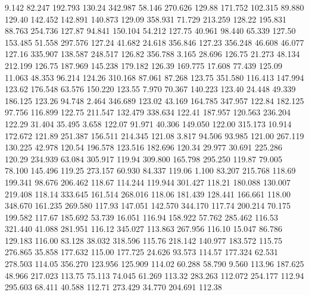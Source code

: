    9.142   82.247  192.793       130.24
 342.987   58.146  270.626       129.88
 171.752  102.315   89.880       129.40
 142.452  142.891  140.873       129.09
 358.931   71.729  213.259       128.22
 195.831   88.763  254.736       127.87
  94.841  150.104   54.212       127.75
  40.961   98.440   65.339       127.50
 153.485   51.558  297.576       127.24
  41.682   24.618  356.846       127.23
 356.248   46.608   46.077       127.16
 335.907  138.587  248.517       126.82
 356.788    3.165   28.696       126.75
  21.273   48.134  212.199       126.75
 187.969  145.238  179.182       126.39
 169.775   17.608   77.439       125.09
  11.063   48.353   96.214       124.26
 310.168   87.061   87.268       123.75
 351.580  116.413  147.994       123.62
 176.548   63.576  150.220       123.55
   7.970   70.367  140.223       123.40
  24.448   49.339  186.125       123.26
  94.748    2.464  346.689       123.02
  43.169  164.785  347.957       122.84
 182.125   97.756  116.899       122.75
 211.547  132.479  338.634       122.41
 187.957  120.563  236.204       122.29
  31.404   35.495    3.658       122.07
  91.971   40.306  149.050       122.00
 315.173   10.914  172.672       121.89
 251.387  156.511  214.345       121.08
   3.817   94.506   93.985       121.00
 267.119  130.225   42.978       120.54
 196.578  123.516  182.696       120.34
  29.977   30.691  225.286       120.29
 234.939   63.084  305.917       119.94
 309.800  165.798  295.250       119.87
  79.005   78.100  145.496       119.25
 273.157   60.930   84.337       119.06
   1.100   83.207  215.768       118.69
 199.341   98.676  206.462       118.67
 114.244  119.944  301.427       118.21
 180.088  130.007  219.408       118.14
 333.645  161.514  268.016       118.06
 181.439  128.441  166.661       118.00
 348.670  161.235  269.580       117.93
 147.051  142.570  344.170       117.74
 200.214   70.175  199.582       117.67
 185.692   53.739   16.051       116.94
 158.922   57.762  285.462       116.53
 321.440   41.088  281.951       116.12
 345.027  113.863  267.956       116.10
  15.047   86.786  129.183       116.00
  83.128   38.032  318.596       115.76
 218.142  140.977  183.572       115.75
 276.865   35.858  177.632       115.00
 177.725   24.626   93.573       114.57
 177.324   62.531  278.503       114.05
 356.270  123.956  125.909       114.02
  60.288   58.790    9.560       113.96
 187.625   48.966  217.023       113.75
  75.113   74.045   61.269       113.32
 283.263  112.072  254.177       112.94
 295.603   68.411   40.588       112.71
 273.429   34.770  204.691       112.38
